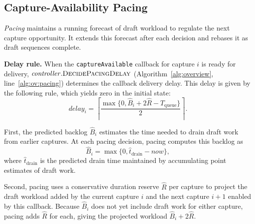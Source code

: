 \subsection{Capture-Availability Pacing}
\label{sec:pacing}

\emph{Pacing} maintains a running forecast of draft workload to regulate the next capture opportunity.
It extends this forecast after each decision and rebases it as draft sequences complete.

\smallskip\noindent\textbf{Delay rule.}
When the \texttt{captureAvailable} callback for capture \(i\) is ready for delivery, \(\mathit{controller}.\textsc{DecidePacingDelay}\) (Algorithm~\ref{alg:overview}, line~\ref{alg:ov:pacing}) determines the callback delivery delay.
This delay is given by the following rule, which yields zero in the initial state:
\begin{equation}
  \mathit{delay}_i
  =
  \left\lceil
    \frac{
      \max\{0,\hat B_i+2\hat R-T_{\mathrm{queue}}\}
    }{2}
  \right\rceil.
  \label{eq:pacing}
\end{equation}

First, the predicted backlog \(\hat B_i\) estimates the time needed to drain draft work from earlier captures.
At each pacing decision, pacing computes this backlog as
\begin{equation}
  \hat B_i
  =
  \max\{0,\hat t_{\mathrm{drain}}-\mathit{now}\},
  \label{eq:backlog}
\end{equation}
where \(\hat t_{\mathrm{drain}}\) is the predicted drain time maintained by accumulating point estimates of draft work.

Second, pacing uses a conservative duration reserve \(\hat R\) per capture to project the draft workload added by the current capture \(i\) and the next capture \(i+1\) enabled by this callback.
Because \(\hat B_i\) does not yet include draft work for either capture, pacing adds \(\hat R\) for each, giving the projected workload \(\hat B_i+2\hat R\).

